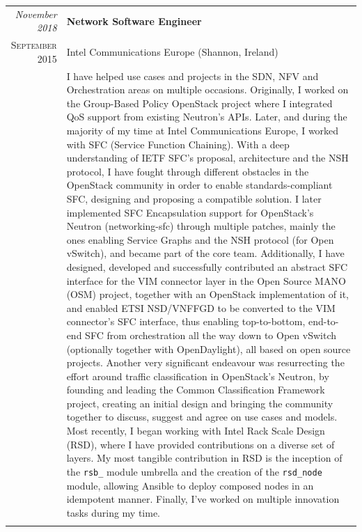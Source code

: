 \documentclass[letter,10pt]{article} %
\begin{document}
\begin{tabular}{r|p{13.4cm}}
	\emph{November 2018} & \textbf{Network Software Engineer} \\
	\textsc{September 2015} & Intel Communications Europe (Shannon, Ireland) \\
	& \scriptsize{I have helped use cases and projects in the SDN, NFV and Orchestration areas on multiple occasions. Originally, I worked on the Group-Based Policy OpenStack project where I integrated QoS support from existing Neutron's APIs. Later, and during the majority of my time at Intel Communications Europe, I worked with SFC (Service Function Chaining). With a deep understanding of IETF SFC's proposal, architecture and the NSH protocol, I have fought through different obstacles in the OpenStack community in order to enable standards-compliant SFC, designing and proposing a compatible solution. I later implemented SFC Encapsulation support for OpenStack's Neutron (networking-sfc) through multiple patches, mainly the ones enabling Service Graphs and the NSH protocol (for Open vSwitch), and became part of the core team. Additionally, I have designed, developed and successfully contributed an abstract SFC interface for the VIM connector layer in the Open Source MANO (OSM) project, together with an OpenStack implementation of it, and enabled ETSI NSD/VNFFGD to be converted to the VIM connector's SFC interface, thus enabling top-to-bottom, end-to-end SFC from orchestration all the way down to Open vSwitch (optionally together with OpenDaylight), all based on open source projects. Another very significant endeavour was resurrecting the effort around traffic classification in OpenStack's Neutron, by founding and leading the Common Classification Framework project, creating an initial design and bringing the community together to discuss, suggest and agree on use cases and models. Most recently, I began working with Intel Rack Scale Design (RSD), where I have provided contributions on a diverse set of layers. My most tangible contribution in RSD is the inception of the \verb+rsb_+ module umbrella and the creation of the \verb+rsd_node+ module, allowing Ansible to deploy composed nodes in an idempotent manner. Finally, I've worked on multiple innovation tasks during my time.}\\
	\multicolumn{2}{c}{} \\


\end{tabular}
\end{document}
